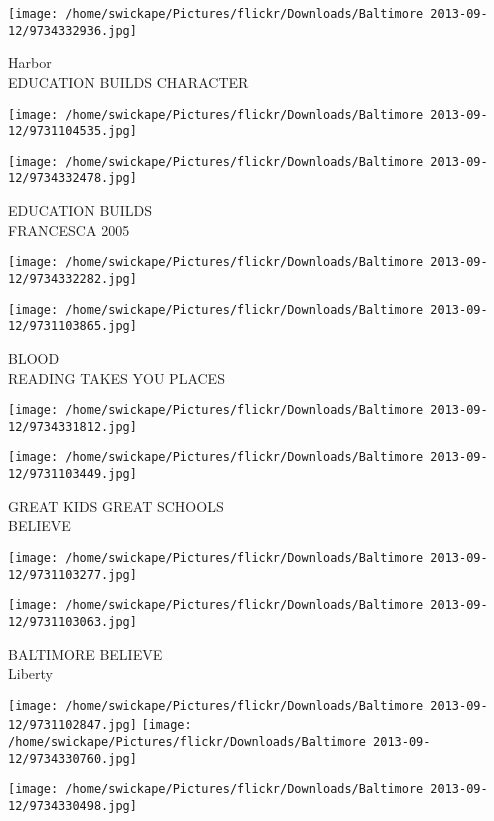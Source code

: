 \documentclass[10pt,letterpaper]{article}
\begin{document}
\vspace{0.25in}
\texttt{[image: /home/swickape/Pictures/flickr/Downloads/Baltimore 2013-09-12/9734332936.jpg]}

Harbor\\
EDUCATION BUILDS CHARACTER
\pagebreak

\texttt{[image: /home/swickape/Pictures/flickr/Downloads/Baltimore 2013-09-12/9731104535.jpg]}

\vspace{0.25in}
\texttt{[image: /home/swickape/Pictures/flickr/Downloads/Baltimore 2013-09-12/9734332478.jpg]}

EDUCATION BUILDS\\
FRANCESCA 2005
\pagebreak

\texttt{[image: /home/swickape/Pictures/flickr/Downloads/Baltimore 2013-09-12/9734332282.jpg]}

\vspace{0.25in}
\texttt{[image: /home/swickape/Pictures/flickr/Downloads/Baltimore 2013-09-12/9731103865.jpg]}

BLOOD\\
READING TAKES YOU PLACES
\pagebreak

\texttt{[image: /home/swickape/Pictures/flickr/Downloads/Baltimore 2013-09-12/9734331812.jpg]}

\vspace{0.25in}
\texttt{[image: /home/swickape/Pictures/flickr/Downloads/Baltimore 2013-09-12/9731103449.jpg]}

GREAT KIDS GREAT SCHOOLS\\
BELIEVE
\pagebreak

\texttt{[image: /home/swickape/Pictures/flickr/Downloads/Baltimore 2013-09-12/9731103277.jpg]}

\vspace{0.25in}
\texttt{[image: /home/swickape/Pictures/flickr/Downloads/Baltimore 2013-09-12/9731103063.jpg]}

BALTIMORE BELIEVE\\
Liberty
\pagebreak

\texttt{[image: /home/swickape/Pictures/flickr/Downloads/Baltimore 2013-09-12/9731102847.jpg]}
\texttt{[image: /home/swickape/Pictures/flickr/Downloads/Baltimore 2013-09-12/9734330760.jpg]}

\vspace{0.25in}
\texttt{[image: /home/swickape/Pictures/flickr/Downloads/Baltimore 2013-09-12/9734330498.jpg]}
\end{document}
